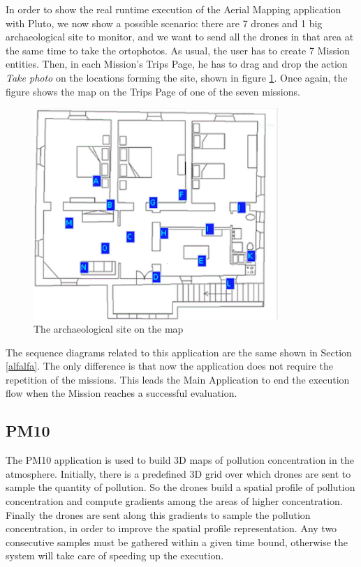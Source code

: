 In order to show the real runtime execution of the Aerial Mapping application with Pluto, we now show a possible scenario:
there are 7 drones and 1 big archaeological site to monitor, and we want to send all the drones in that area at the same time to take the ortophotos.
As usual, the user has to create 7 Mission entities.
Then, in each Mission's Trips Page, he has to drag and drop the action \textit{Take photo} on the locations forming the site, shown in figure \ref{fig:puttiArea}.
Once again, the figure shows the map on the Trips Page of one of the seven missions.

\begin{figure}[h!]
\centering
\includegraphics[width=\linewidth, height=8cm]{pictures/puttiArea.png}
\caption{The archaeological site on the map}
\label{fig:puttiArea}
\end{figure}

The sequence diagrams related to this application are the same shown in Section \ref{alfalfa}. 
The only difference is that now the application does not require the repetition of the missions.
This leads the Main Application to end the execution flow when the Mission reaches a successful evaluation.

\subsection{PM10}

The PM10\cite{pm10} application is used to build 3D maps of pollution concentration in the atmosphere. 
Initially, there is a predefined 3D grid over which drones are sent to sample the quantity of pollution.
So the drones build a spatial profile of pollution concentration and compute gradients among the areas of higher concentration.
Finally the drones are sent along this gradients to sample the pollution concentration, in order to improve the spatial profile representation.
Any two consecutive samples must be gathered within a given time bound, otherwise the system will take care of speeding up the execution.

